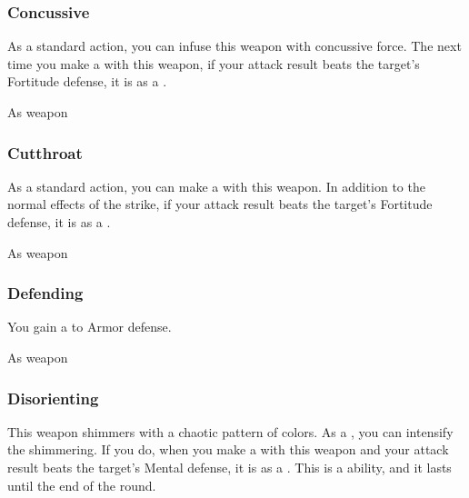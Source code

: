 
\lowercase{\hypertarget{item:Concussive}{}}\label{item:Concussive}
\hypertarget{item:Concussive}{\subsubsection{Concussive\hfill{}}}

As a standard action, you can infuse this weapon with concussive force.
The next time you make a  with this weapon, if your attack result beats the target's Fortitude defense, it is  as a .



 As weapon


\lowercase{\hypertarget{item:Cutthroat}{}}\label{item:Cutthroat}
\hypertarget{item:Cutthroat}{\subsubsection{Cutthroat\hfill{}}}

As a standard action, you can make a  with this weapon.
In addition to the normal effects of the strike, if your attack result beats the target's Fortitude defense, it is  as a .



 As weapon


\lowercase{\hypertarget{item:Defending}{}}\label{item:Defending}
\hypertarget{item:Defending}{\subsubsection{Defending\hfill{}}}

You gain a   to Armor defense.



 


 As weapon


\lowercase{\hypertarget{item:Disorienting}{}}\label{item:Disorienting}
\hypertarget{item:Disorienting}{\subsubsection{Disorienting\hfill{}}}

This weapon shimmers with a chaotic pattern of colors.
As a , you can intensify the shimmering.
If you do, when you make a   with this weapon and your attack result beats the target's Mental defense, it is \disoriented as a .
This is a  ability, and it lasts until the end of the round.



